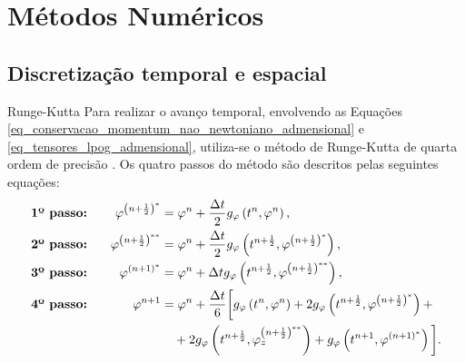 \section{Métodos Numéricos}

\subsection{Discretização temporal e espacial}

\begin{frame}{Runge-Kutta}
Para realizar o avanço temporal, envolvendo as Equações \eqref{eq_conservacao_momentum_nao_newtoniano_admensional} e \eqref{eq_tensores_lpog_admensional}, utiliza-se o método de Runge-Kutta de quarta ordem de precisão \cite{ferziger2002computational}. Os quatro passos do método são descritos pelas seguintes equações:
\begin{gather}
    \begin{aligned}
        &\textbf{1º passo:}& \hspace{0.3cm}\varphi^{\left(n+\frac{1}{2}\right)^{*}} &= \varphi^n+\frac{\Delta t}{2} g_{\varphi}\left(t^n, \varphi^n\right),\\
        &\textbf{2º passo:}& \hspace{0.3cm}\varphi^{\left(n+\frac{1}{2}\right)^{* *}} &= \varphi^n+\frac{\Delta t}{2} g_{\varphi}\left(t^{n+\frac{1}{2}}, \varphi^{\left(n+\frac{1}{2}\right)^*}\right),\\
        &\textbf{3º passo:}& \hspace{0.3cm}\varphi^{(n+1)^*} &= \varphi^n+\Delta t g_{\varphi}\left(t^{n+\frac{1}{2}},\varphi^{\left(n+\frac{1}{2}\right)^{* *}}\right),\\
        &\textbf{4º passo:}& \hspace{0.3cm}\varphi^{n+1} &= \varphi^n+\frac{\Delta t}{6}\bigg[g_{\varphi}\left(t^n, \varphi^n\right) + 2 g_{\varphi}\left(t^{n+\frac{1}{2}}, \varphi^{\left(n+\frac{1}{2}\right)^{*}}\right) + \\
        & & & ~~~ + 2 g_{\varphi}\left(t^{n+\frac{1}{2}}, \varphi_{z}^{\left(n+\frac{1}{2}\right)^{**}}\right)+ g_{\varphi}\left(t^{n+1}, \varphi^{(n+1)^{*}}\right)\bigg].\label{eq_rk_4order}
    \end{aligned}
\end{gather}
\end{frame}

